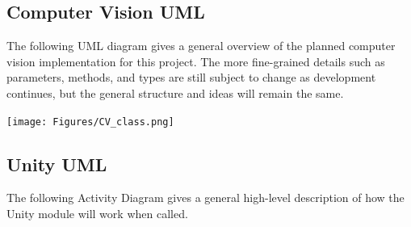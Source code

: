 \documentclass[12pt]{article}
\let\origfigure=\figure
\let\endorigfigure=\endfigure
\renewenvironment{figure}[1][]{%
  \origfigure[H]
}{%
  \endorigfigure
}
\begin{document}
\subsection{Computer Vision UML}\label{computer-vision-uml}

The following UML diagram gives a general overview of the planned
computer vision implementation for this project. The more fine-grained
details such as parameters, methods, and types are still subject to
change as development continues, but the general structure and ideas
will remain the same.

\begin{figure}
\centering
\texttt{[image: Figures/CV\_class.png]}
\caption{Computer Vision Class Diagram}
\end{figure}

\subsection{Unity UML}\label{unity-uml}

The following Activity Diagram gives a general high-level description of
how the Unity module will work when called.
\end{document}
